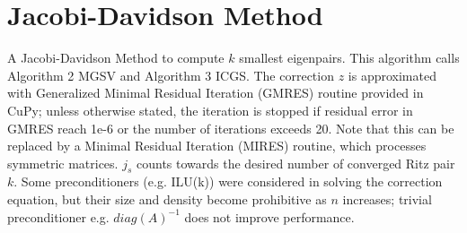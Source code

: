 \documentclass[a4paper]{article}
\begin{document}
\pagebreak
\section{Jacobi-Davidson Method}

A Jacobi-Davidson Method to compute $k$ smallest eigenpairs. This algorithm calls Algorithm 2 MGSV and Algorithm 3 ICGS. The correction $z$ is approximated with Generalized Minimal Residual Iteration (GMRES) routine provided in CuPy; unless otherwise stated, the iteration is stopped if residual error in GMRES reach 1e-6 or the number of iterations exceeds 20. Note that this can be replaced by a Minimal Residual Iteration (MIRES) routine, which processes symmetric matrices. $j_s$ counts towards the desired number of converged Ritz pair $k$. Some preconditioners (e.g. ILU(k)) were considered in solving the correction equation, but their size and density become prohibitive as $n$ increases; trivial preconditioner e.g. $diag(A)^{-1}$ does not improve performance.
\end{document}
